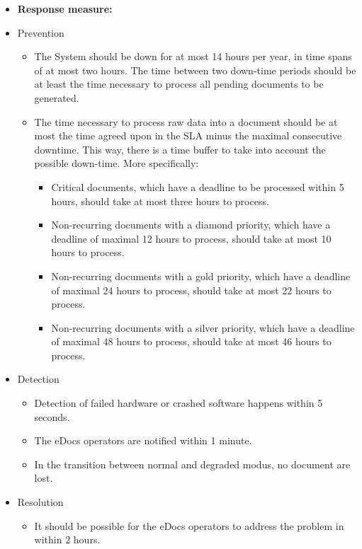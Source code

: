 \documentclass[a4paper,10pt]{article}
\begin{document}
\begin{itemize}
    \item \textbf{Response measure:}
            \item Prevention
		\begin{itemize}
			\item The System should be down for at most 14 hours per year, in time spans of at most two hours. The time between two down-time periods should be at least the time necessary to process all pending documents to be generated.
			\item The time necessary to process raw data into a document should be at most the time agreed upon in the SLA minus the maximal consecutive downtime. This way, there is a time buffer to take into account the possible down-time. More specifically:
			\begin{itemize}
			\item Critical documents, which have a deadline to be processed within 5 hours, should take at most three hours to process.
			\item Non-recurring documents with a diamond priority, which have a deadline of maximal 12 hours to process, should take at most 10 hours to process.
			\item Non-recurring documents with a gold priority, which have a deadline of maximal 24 hours to process, should take at most 22 hours to process.
			\item  Non-recurring documents with a silver priority, which have a deadline of maximal 48 hours to process, should take at most 46 hours to process.
			\end{itemize}
		\end{itemize}
            \item Detection
		\begin{itemize}
			\item Detection of failed hardware or crashed software happens within 5 seconds.
			\item The eDocs operators are notified within 1 minute.
			\item In the transition between normal and degraded modus, no document are lost.
		\end{itemize}
            \item Resolution
		\begin{itemize}
			\item It should be possible for the eDocs operators to address the problem in within 2 hours.
		\end{itemize}
\end{itemize}
\end{document}
